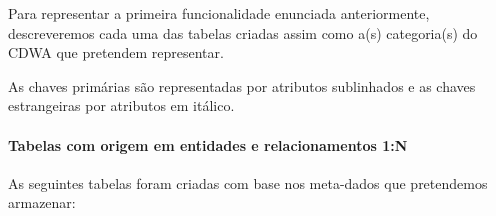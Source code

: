 \documentclass[letterpaper]{article}
\begin{document}
\bigskip

{
Para representar a primeira funcionalidade enunciada anteriormente,
descreveremos cada uma das tabelas criadas assim como a(s) categoria(s)
do CDWA que pretendem representar.}


\bigskip

{
As chaves prim\'arias s\~ao representadas por atributos sublinhados e as
chaves estrangeiras por atributos em it\'alico.}


\bigskip

\paragraph[Tabelas com origem em entidades e relacionamentos
1:N]{ Tabelas com origem em entidades e
relacionamentos 1:N}
{
As seguintes tabelas foram criadas com base nos meta-dados que
pretendemos armazenar:}
\end{document}
